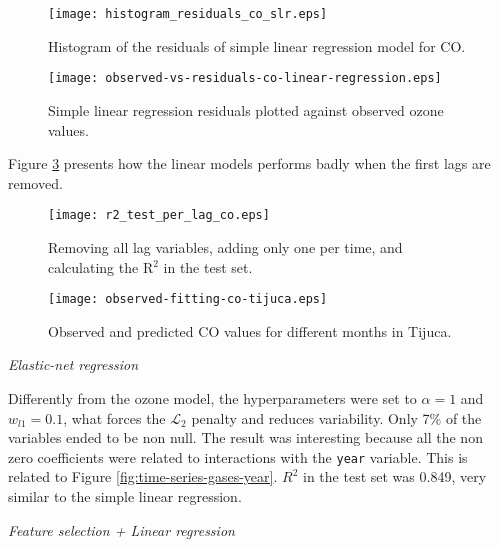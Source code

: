 \begin{figure}
    \centering
    \texttt{[image: histogram\_residuals\_co\_slr.eps]}
    \caption{Histogram of the residuals of simple linear regression model for CO.}
    \label{fig:histogram-residuals-co-slr}
\end{figure}

\begin{figure}[!ht]
    \centering
    \texttt{[image: observed-vs-residuals-co-linear-regression.eps]}
    \caption{Simple linear regression residuals plotted against
    observed ozone values.}
    \label{fig:observed-vs-residual-co-linear-regression}
\end{figure}

Figure \ref{fig:r2-test-lag-co} presents how the linear models performs badly when the first lags are removed.

\begin{figure}[!ht]
    \centering
    \texttt{[image: r2\_test\_per\_lag\_co.eps]}
    \caption{Removing all lag variables, adding only one per time, and calculating the R$^2$ in the test set.}
    \label{fig:r2-test-lag-co}
\end{figure}

\begin{figure*}[!ht]
    \centering
    \texttt{[image: observed-fitting-co-tijuca.eps]}
    \caption{Observed and predicted CO values for different months in Tijuca.}
    \label{fig:observed-fitting-co-tijuca}
\end{figure*}

\vspace{2mm}

{\em Elastic-net regression}

\vspace{2mm}

Differently from the ozone model, the hyperparameters were set to $\alpha = 1$
and $w_{l1} = 0.1$, what forces the $\mathcal{L}_2$ penalty and reduces
variability. Only 7\% of the variables ended to be non null. The result was interesting because all the non
zero coefficients were related to interactions with the {\tt year} variable.
This is related to Figure \ref{fig:time-series-gases-year}. $R^2$ in the test
set was 0.849, very similar to the simple linear regression. 

\vspace{2mm}

{\em Feature selection + Linear regression}

